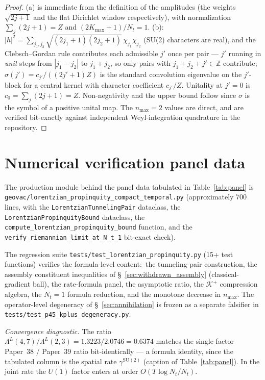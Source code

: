 \documentclass[11pt,a4paper]{article}
\theoremstyle{plain}
\theoremstyle{definition}
\newcommand{\nmax}{n_{\max}}
\newcommand{\Nt}{N_{t}}
\newcommand{\Kmax}{K_{\max}}
\newcommand{\Krein}{\mathcal{K}}
\newcommand{\SU}{\mathrm{SU}}
\newcommand{\Uone}{U(1)}
\newcommand{\Lprop}{\Lambda^{L}}
\newcommand{\gammaSU}{\gamma^{\SU(2)}}
\newcommand{\Kplus}{\Krein^{+}}
\begin{document}
\begin{proof}
(a) is immediate from the definition of the amplitudes (the weights
$\sqrt{2j+1}$ and the flat Dirichlet window respectively), with
normalization $\sum_j (2j+1) = Z$ and $(2\Kmax+1)/\Nt = 1$. (b):\
$|h|^{2} = \sum_{j_1, j_2} \sqrt{(2j_1+1)(2j_2+1)}\,
\chi_{j_1}\chi_{j_2}$ (SU(2) characters are real), and the
Clebsch--Gordan rule contributes each admissible $j'$ once per pair
--- $j'$ running in \emph{unit} steps from $|j_1 - j_2|$ to
$j_1 + j_2$, so only pairs with $j_1 + j_2 + j' \in \mathbb{Z}$
contribute;\
$\sigma(j') = c_{j'}/((2j'+1)Z)$ is the standard convolution
eigenvalue on the $j'$-block for a central kernel with character
coefficient $c_{j'}/Z$. Unitality at $j' = 0$ is $c_{0} = \sum_j
(2j+1) = Z$. Non-negativity and the upper bound follow since
$\sigma$ is the symbol of a positive unital map. The $\nmax = 2$
values are direct, and are verified bit-exactly against independent
Weyl-integration quadrature in the repository. \qedhere
\end{proof}

\section{Numerical verification panel data}\label{app:panel}

The production module behind the panel data tabulated in
Table~\ref{tab:panel} is \texttt{geovac/lorentzian\_propinquity\_compact\_temporal.py}
(approximately 700 lines, with the
\texttt{LorentzianTunnelingPair} dataclass, the
\texttt{LorentzianPropinquityBound} dataclass, the
\texttt{compute\_lorentzian\_propinquity\_bound} function, and the
\texttt{verify\_riemannian\_limit\_at\_N\_t\_1} bit-exact check).

The regression suite \texttt{tests/test\_lorentzian\_propinquity.py}
(15+ test functions) verifies the formula-level content:\ the
tunneling-pair construction, the assembly constituent inequalities of
\S~\ref{sec:withdrawn_assembly} (classical-gradient ball), the
rate-formula panel, the
asymptotic ratio, the $\Kplus$ compression algebra, the $\Nt = 1$
formula reduction, and the monotone decrease in $\nmax$. The
operator-level degeneracy of \S~\ref{sec:annihilation} is frozen as a
separate falsifier in
\texttt{tests/test\_p45\_kplus\_degeneracy.py}.

\medskip\noindent\textit{Convergence diagnostic.} The ratio
$\Lprop(4, 7) / \Lprop(2, 3) = 1.3223 / 2.0746 = 0.6374$ matches the
single-factor Paper~38 / Paper~39 ratio bit-identically --- a formula
identity, since the tabulated column is the spatial rate $\gammaSU$
(caption of Table~\ref{tab:panel}).  In the joint rate the $\Uone$ factor
enters at order $O(T\log\Nt/\Nt)$.
\end{document}
